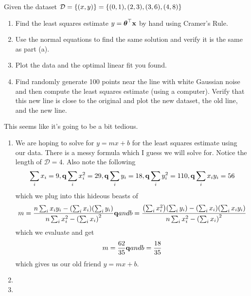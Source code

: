 \documentclass[12pt,letterpaper]{hmcpset}
\begin{document}
\begin{problem}[2]
Given the dataset ${\cal D} = \{(x,y)\} = \{(0,1), (2,3), (3,6), (4,8)\}$
\begin{enumerate}
   \item Find the least squares estimate $y = \hbox{\boldmath$\theta$}^\top{\bf x}$ by hand using
        Cramer's Rule.
    \item Use the normal equations to find the same solution and verify it
        is the same as part (a).
    \item Plot the data and the optimal linear fit you found.
    \item Find randomly generate 100 points near the line with white Gaussian
        noise and then compute the least squares estimate (using a computer).
        Verify that this new line is close to the original and plot the new
        dataset, the old line, and the new line.
\end{enumerate}

\end{problem}
\begin{solution}
    This seems like it's going to be a bit tedious.
    \begin{enumerate}
        \item We are hoping to solve for $y = m x + b$ for the least squares estimate using our data. There is a messy formula which I guess we will solve for. Notice the length of $\mathcal D = 4$. Also note the following 
        \begin{align*}
            \sum_i x_i = 9, {\bf q}{} \sum_i x_i^2 = 29, {\bf q}{} \sum_i y_i = 18, {\bf q}{} \sum_i y_i^2 = 110,  {\bf q}{} \sum_i x_iy_i = 56
        \end{align*}
        which we plug into this hideous beasts of 
        \begin{align*}
            m = \frac{n \sum_i x_iy_i - \qty(\sum_i x_i) \qty(\sum_i y_i) }{n \sum_i x_i^2 - \qty(\sum_i x_i)^2}
            {\bf q}{and}
            b = \frac{\qty(\sum_i x_i^2)\qty(\sum_i y_i) - \qty(\sum_i x_i)\qty(\sum_i x_iy_i)}{n \sum_i x_i^2 - \qty(\sum_i x_i)^2}
        \end{align*}
        which we evaluate and get
        \begin{align*}
            m = \frac{62}{35}
            {\bf q}{and}
            b = \frac{18}{35}
        \end{align*}
        which gives us our old friend $y = mx + b$.

        \item

        \item
    \end{enumerate}
\end{solution}
\newpage
\end{document}
